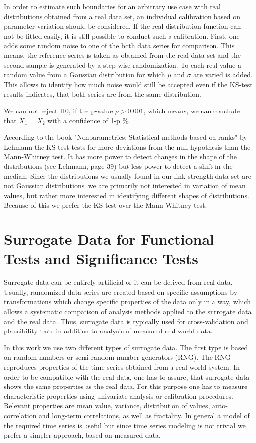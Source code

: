 \documentclass[a4paper,10pt]{scrbook}
\begin{document}
In order to estimate such boundaries for an arbitrary use case with real distributions obtained from a real data set, an individual calibration based on parameter variation should be considered. If the real distribution function can not be fitted easily, it is still possible to conduct such a calibration. First, one adds some random noise to one of the both data series for comparison. This means, the reference series is taken as obtained from the real data set and the second sample is generated by a step wise randomization. To each real value a random value from a Gaussian distribution for which $\mu$ and $\sigma$ are varied is added. This allows to identify how much noise would still be accepted even if the KS-test results indicates, that both series are from the same distribution.   

We can not reject H0, if the p-value $p > 0.001$, which means, we can conclude that  $X_1 = X_2$ with a confidence of 1-p $\%$.

According to the book "Nonparametrics: Statistical methods based on ranks" by Lehmann \cite{bookLehmann} the KS-test tests for more deviations from the null hypothesis than the Mann-Whitney test. It has more power to detect changes in the shape of the distributions (see Lehmann, page 39) but less power to detect a shift in the median. Since the distributions we usually found in our link strength data set are not Gaussian distributions, we are primarily not interested in variation of mean values, but rather more interested in identifying different shapes of distributions. Because of this we prefer the KS-test over the Mann-Whitney test. 



\newpage

\section{Surrogate Data for Functional Tests and Significance Tests}

Surrogate data can be entirely artificial or it can be derived from real data. Usually, randomized data series are created based on specific assumptions by transformations which change specific properties of the data only in a way, which allows a systematic comparison of analysis methods applied to the surrogate data and the real data. Thus, surrogate data is typically used for cross-validation and plausibility tests in addition to analysis of measured real world data. 

In this work we use two different types of surrogate data. The first type is based on random numbers or semi random number generators (RNG). The RNG reproduces properties of the time series obtained from a real world system. In order to be compatible with the real data, one has to assure, that surrogate data shows the same properties as the real data. For this purpose one has to measure characteristic properties using univariate analysis or calibration procedures. Relevant properties are mean value, variance, distribution of values, auto-correlation and long-term correlations, as well as fractality. In general a model of the required time series is useful but since time series modeling is not trivial we prefer a simpler approach, based on measured data.
\end{document}
